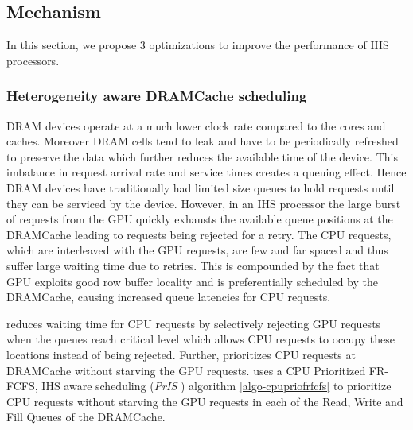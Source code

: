 \newcommand{\bypassname}{\textit{ByE }}
\newcommand{\prioname}{\textit{PrIS }}
\subsection{\cachename Mechanism} \label{mechanism}
In this section, we propose 3 optimizations to improve the performance of IHS processors.

\subsubsection{Heterogeneity aware DRAMCache scheduling}
DRAM devices operate at a much lower clock rate compared to the cores and caches. Moreover DRAM cells tend to leak and have to be periodically refreshed to preserve the data which further reduces the available time of the device. This imbalance in request arrival rate and service times creates a queuing effect. Hence DRAM devices have traditionally had limited size queues to hold requests until they can be serviced by the device. However, in an IHS processor the large burst of requests from the GPU quickly exhausts the available queue positions at the DRAMCache  leading to requests being rejected for a retry. The CPU requests, which are interleaved with the GPU requests, are few and far spaced and thus suffer large waiting time due to retries. This is compounded by the fact that GPU exploits good row buffer locality and is preferentially scheduled by the DRAMCache, causing increased queue latencies for CPU requests.
\par \cachename reduces waiting time for CPU requests by selectively rejecting GPU requests when the queues reach critical level which allows CPU requests to occupy these locations instead of being rejected. Further, \cachename prioritizes CPU requests at DRAMCache without starving the GPU requests. \cachename uses a CPU Prioritized FR-FCFS, IHS aware scheduling (\prioname) algorithm \ref{algo-cpupriofrfcfs} to prioritize CPU requests without starving the GPU requests in each of the Read, Write and Fill Queues of the DRAMCache.
